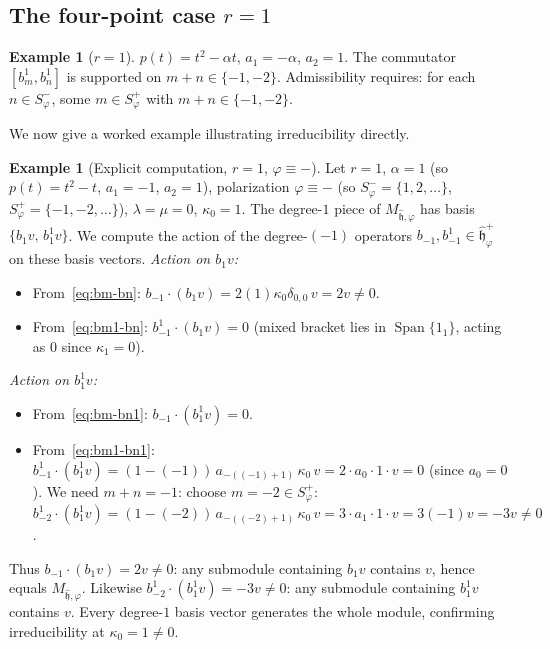 \documentclass{amsart}
\DeclareMathOperator{\Span}{Span}
\newcommand{\h}{\mathfrak{h}}
\newcommand{\wh}[1]{\widehat{#1}}
\newcommand{\whh}{\wh{\h}}
\theoremstyle{definition}
\newtheorem{example}[theorem]{Example}
\theoremstyle{remark}
\numberwithin{equation}{section}
\begin{document}
\subsection{The four-point case $r=1$}
\begin{example}[$r=1$]\label{ex:r=1}
$p(t)=t^2-\alpha t$, $a_1=-\alpha$, $a_2=1$.
The commutator $[b_m^1,b_n^1]$ is supported on $m+n\in\{-1,-2\}$.
Admissibility requires: for each $n\in S_\varphi^-$, some $m\in S_\varphi^+$
with $m+n\in\{-1,-2\}$.
\end{example}
We now give a worked example illustrating irreducibility directly.
\begin{example}[Explicit computation, $r=1$, $\varphi\equiv-$]\label{ex:worked}
Let $r=1$, $\alpha=1$ (so $p(t)=t^2-t$, $a_1=-1$, $a_2=1$),
polarization $\varphi\equiv-$ (so $S_\varphi^-=\{1,2,\dots\}$,
$S_\varphi^+=\{-1,-2,\dots\}$), $\lambda=\mu=0$, $\kappa_0=1$.
The degree-$1$ piece of $M_{\whh,\varphi}$ has basis $\{b_1v,\,b_1^1v\}$.
We compute the action of the degree-$(-1)$ operators
$b_{-1},b_{-1}^1\in\whh_\varphi^+$ on these basis vectors.
\textit{Action on $b_1 v$:}
\begin{itemize}
\item From~\eqref{eq:bm-bn}: $b_{-1}\cdot(b_1 v)=2(1)\kappa_0\delta_{0,0}\,v
  =2v\neq0$.
\item From~\eqref{eq:bm1-bn}: $b_{-1}^1\cdot(b_1 v)=0$ (mixed bracket
  lies in $\Span\{1_1\}$, acting as $0$ since $\kappa_1=0$).
\end{itemize}
\textit{Action on $b_1^1 v$:}
\begin{itemize}
\item From~\eqref{eq:bm-bn1}: $b_{-1}\cdot(b_1^1 v)=0$.
\item From~\eqref{eq:bm1-bn1}: $b_{-1}^1\cdot(b_1^1 v)
  =(1-(-1))\,a_{-((-1)+1)}\,\kappa_0\,v
  =2\cdot a_0\cdot 1\cdot v=0$ (since $a_0=0$).
  We need $m+n=-1$: choose $m=-2\in S_\varphi^+$:
  $b_{-2}^1\cdot(b_1^1 v)=(1-(-2))\,a_{-((-2)+1)}\,\kappa_0\,v
  =3\cdot a_{1}\cdot 1\cdot v=3(-1)v=-3v\neq0$.
\end{itemize}
Thus $b_{-1}\cdot(b_1 v)=2v\neq0$: any submodule containing $b_1 v$
contains $v$, hence equals $M_{\whh,\varphi}$.
Likewise $b_{-2}^1\cdot(b_1^1 v)=-3v\neq0$: any submodule containing
$b_1^1 v$ contains $v$.  Every degree-$1$ basis vector generates the
whole module, confirming irreducibility at $\kappa_0=1\neq0$.
\end{example}
\end{document}
